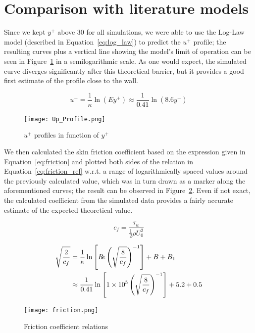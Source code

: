 \documentclass[12pt]{article}
\begin{document}
\section{Comparison with literature models} \label{sec:literature}

        Since we kept \( y^+ \) above 30 for all simulations, we were able to use the Log-Law model (described in Equation~\ref{eq:log_law}) to predict the \( u^+ \) profile; the resulting curves plus a vertical line showing the model's limit of operation can be seen in Figure~\ref{fig:u_plus} in a semilogarithmic scale. As one would expect, the simulated curve diverges significantly after this theoretical barrier, but it provides a good first estimate of the profile close to the wall.

        \begin{equation} \label{eq:log_law}
                u^+ = \frac{1}{\kappa} \ln(E y^+) \approx \frac{1}{0.41} \ln(8.6y^+)
        \end{equation}
        
        \begin{figure}
                \centering
                \texttt{[image: Up\_Profile.png]}
                \caption{\( u^+ \) profiles in function of \( y^+ \)}
                \label{fig:u_plus}
        \end{figure}

        We then calculated the skin friction coefficient based on the expression given in Equation~\ref{eq:friction} and plotted both sides of the relation in Equation~\ref{eq:friction_rel} w.r.t. a range of logarithmically spaced values around the previously calculated value, which was in turn drawn as a marker along the aforementioned curves; the result can be observed in Figure~\ref{fig:friction}. Even if not exact, the calculated coefficient from the simulated data provides a fairly accurate estimate of the expected theoretical value.

        \begin{equation} \label{eq:friction}
                c_f = \frac{\tau_w}{\frac{1}{2} \rho U_0^2}
        \end{equation}

        \begin{equation} \label{eq:friction_rel}
                \begin{split}
                        \sqrt{\frac{2}{c_f}} & = \frac{1}{\kappa} \ln \left[ R\!e \left( \sqrt{\frac{8}{c_f}} \right)^{-1} \right] + B + B_1 \\
                        & \approx \frac{1}{0.41} \ln \left[ \num{1E5} \left( \sqrt{\frac{8}{c_f}} \right)^{-1} \right] + 5.2 + 0.5
                \end{split}
        \end{equation}

        \begin{figure}
                \centering
                \texttt{[image: friction.png]}
                \caption{Friction coefficient relations}
                \label{fig:friction}
        \end{figure}



\end{document}
